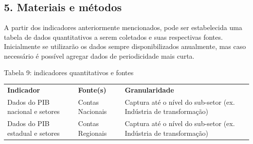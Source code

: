 \subsection{\texorpdfstring{\textbf{5. Materiais e
métodos}}{5. Materiais e métodos}}\label{materiais-e-muxe9todos}

A partir dos indicadores anteriormente mencionados, pode ser
estabelecida uma tabela de dados quantitativos a serem coletados e suas
respectivas fontes. Inicialmente se utilizarão os dados sempre
disponibilizados anualmente, mas caso necessário é possível agregar
dados de periodicidade mais curta.

Tabela 9: indicadores quantitativos e fontes

\begin{longtable}[]{@{}
  >{\raggedright\arraybackslash}p{}
  >{\raggedright\arraybackslash}p{}
  >{\raggedright\arraybackslash}p{}@{}}
\toprule\noalign{}
\begin{minipage}[b]{\linewidth}\raggedright
\textbf{Indicador}
\end{minipage} & \begin{minipage}[b]{\linewidth}\raggedright
\textbf{Fonte(s)}
\end{minipage} & \begin{minipage}[b]{\linewidth}\raggedright
\textbf{Granularidade}
\end{minipage} \\
\begin{minipage}[b]{\linewidth}\raggedright
Dados do PIB nacional e setores
\end{minipage} & \begin{minipage}[b]{\linewidth}\raggedright
Contas Nacionais
\end{minipage} & \begin{minipage}[b]{\linewidth}\raggedright
Captura até o nível do sub-setor (ex. Indústria de transformação)
\end{minipage} \\
\begin{minipage}[b]{\linewidth}\raggedright
Dados do PIB estadual e setores
\end{minipage} & \begin{minipage}[b]{\linewidth}\raggedright
Contas Regionais
\end{minipage} & \begin{minipage}[b]{\linewidth}\raggedright
Captura até o nível do sub-setor (ex. Indústria de transformação)

\end{minipage}
\end{longtable}
